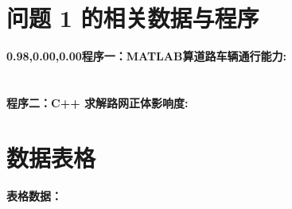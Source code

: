 \documentclass[12pt,a4paper]{nmmcm}
\begin{document}
\begin{appendices}

  \section*{问题 1 的相关数据与程序}

  \textbf{{0.98,0.00,0.00}{程序一：MATLAB算道路车辆通行能力:}}
  

  \section*{}

  \textcolor[rgb]{0.98,0.00,0.00}{\textbf{程序二：C++ 求解路网正体影响度:}}
  

  \newpage
  \def\thesection{A}
  \renewcommand{\thetable}{\wuhao A-\arabic{table}}
  \setcounter{table}{0}
  \section*{数据表格}
  \textcolor[rgb]{0.98,0.00,0.00}{\textbf{表格数据：}}
  

\end{appendices}
\end{document}
